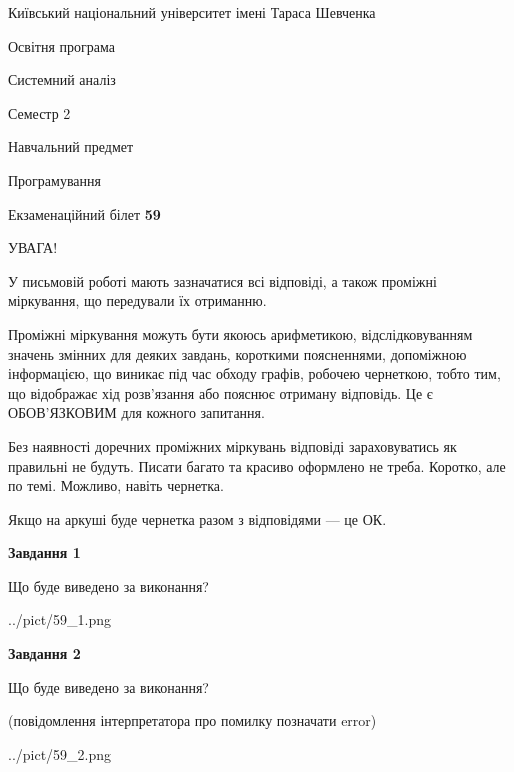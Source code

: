 \documentclass[12pt, ukrainian]{article}
\begin{document}
{{\begin {small}\par
{ \center  Київський національний університет імені Тараса Шевченка \par}
{\parbox {5 cm}{Освітня програма \hfill}{\parbox {7 cm}{Системний аналіз \hfill}}\parbox {6 cm}{\hfill Семестр 2}}\par
{\parbox {5 cm} {Навчальний предмет \hfill}\parbox {7 cm}{Програмування \hfill}\parbox {6cm}{\hfill}\par}\vspace{-7pt} \end{small}}{\center Екзаменаційний білет \No \textbf
{ 59 }\par}}
{
\begin {large}
УВАГА!

У письмовій роботі мають зазначатися всі відповіді, а також проміжні міркування, що передували їх отриманню.

Проміжні міркування можуть бути якоюсь арифметикою, відслідковуванням зна\-чень змінних для деяких завдань,
короткими поясненнями, допоміжною інформацією, що виникає під час обходу графів, робочею чернеткою,
тобто тим, що відображає хід розв’язання або пояснює отриману відповідь.
Це є ОБОВ’ЯЗКОВИМ для кожного запитання.

Без наявності доречних проміжних міркувань відповіді зараховуватись як правиль\-ні не будуть.
Писати багато та красиво оформлено не треба. Коротко, але по темі. Можли\-во, навіть чернетка.

Якщо на аркуші буде чернетка разом з відповідями --- це ОК.

\newpage

{\begin {center}\textbf{Завдання 1}\end {center}}\par
Що буде виведено за виконання?\par
\begin{center}
	{../pict/59_1.png}
\end{center}
\newpage

{\begin {center}\textbf{Завдання 2}\end {center}}\par
Що буде виведено за виконання?\par
 (повідомлення інтерпретатора про помилку позначати error)\par
\begin{center}
	{../pict/59_2.png}
\end{center}
\newpage


\end{large}}
\end{document}
